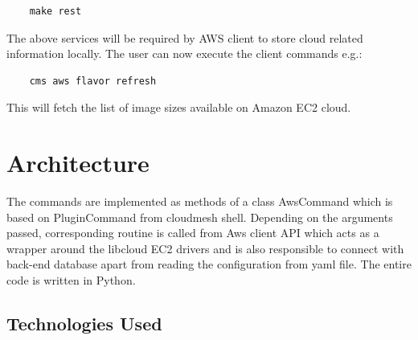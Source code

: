 \documentclass[9pt,twocolumn,twoside]{../../styles/osajnl}
\begin{document}
\begin{verbatim}
    make rest
\end{verbatim}

The above services will be required by AWS client to store cloud related information locally. The user can now execute the client commands e.g.:

\begin{verbatim}
    cms aws flavor refresh
\end{verbatim}

This will fetch the list of image sizes available on Amazon EC2 cloud.

\section{Architecture}

The commands are implemented as methods of a class AwsCommand which is based on PluginCommand from cloudmesh shell. Depending on the arguments passed, corresponding routine is called from Aws client API which acts as a wrapper around the libcloud EC2 drivers and is also responsible to connect with back-end database apart from reading the configuration from yaml file. The entire code is written in Python.

\subsection{Technologies Used}
\end{document}
